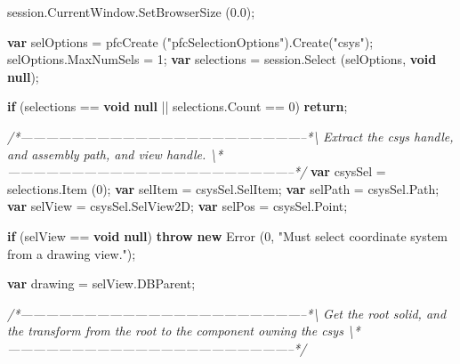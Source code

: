 \documentclass[]{article}
\newenvironment{Shaded}{}{}
\newcommand{\KeywordTok}[1]{\textcolor[rgb]{0.00,0.44,0.13}{\textbf{{#1}}}}
\newcommand{\DecValTok}[1]{\textcolor[rgb]{0.25,0.63,0.44}{{#1}}}
\newcommand{\FloatTok}[1]{\textcolor[rgb]{0.25,0.63,0.44}{{#1}}}
\newcommand{\StringTok}[1]{\textcolor[rgb]{0.25,0.44,0.63}{{#1}}}
\newcommand{\CommentTok}[1]{\textcolor[rgb]{0.38,0.63,0.69}{\textit{{#1}}}}
\newcommand{\OtherTok}[1]{\textcolor[rgb]{0.00,0.44,0.13}{{#1}}}
\newcommand{\FunctionTok}[1]{\textcolor[rgb]{0.02,0.16,0.49}{{#1}}}
\newcommand{\NormalTok}[1]{{#1}}
\begin{document}
\begin{Shaded}
\begin{Highlighting}[]
  \OtherTok{session}\NormalTok{.}\OtherTok{CurrentWindow}\NormalTok{.}\FunctionTok{SetBrowserSize} \NormalTok{(}\FloatTok{0.0}\NormalTok{);}
  
  \KeywordTok{var} \NormalTok{selOptions = }\FunctionTok{pfcCreate} \NormalTok{(}\StringTok{"pfcSelectionOptions"}\NormalTok{).}\FunctionTok{Create}\NormalTok{(}\StringTok{"csys"}\NormalTok{);}
  \OtherTok{selOptions}\NormalTok{.}\FunctionTok{MaxNumSels} \NormalTok{= }\DecValTok{1}\NormalTok{;}
  \KeywordTok{var} \NormalTok{selections = }\OtherTok{session}\NormalTok{.}\FunctionTok{Select} \NormalTok{(selOptions, }\KeywordTok{void} \KeywordTok{null}\NormalTok{);}
  
  \KeywordTok{if} \NormalTok{(selections == }\KeywordTok{void} \KeywordTok{null} \NormalTok{|| }\OtherTok{selections}\NormalTok{.}\FunctionTok{Count} \NormalTok{== }\DecValTok{0}\NormalTok{)}
    \KeywordTok{return}\NormalTok{;}
        
\CommentTok{/*--------------------------------------------------------------------*\textbackslash{}    }
\CommentTok{  Extract the csys handle, and assembly path, and view handle.}
\CommentTok{\textbackslash{}*--------------------------------------------------------------------*/}
  \KeywordTok{var} \NormalTok{csysSel = }\OtherTok{selections}\NormalTok{.}\FunctionTok{Item} \NormalTok{(}\DecValTok{0}\NormalTok{);}
  \KeywordTok{var} \NormalTok{selItem = }\OtherTok{csysSel}\NormalTok{.}\FunctionTok{SelItem}\NormalTok{;}
  \KeywordTok{var} \NormalTok{selPath = }\OtherTok{csysSel}\NormalTok{.}\FunctionTok{Path}\NormalTok{;  }
  \KeywordTok{var} \NormalTok{selView = }\OtherTok{csysSel}\NormalTok{.}\FunctionTok{SelView2D}\NormalTok{;}
  \KeywordTok{var} \NormalTok{selPos = }\OtherTok{csysSel}\NormalTok{.}\FunctionTok{Point}\NormalTok{;}
  
  \KeywordTok{if} \NormalTok{(selView == }\KeywordTok{void} \KeywordTok{null}\NormalTok{)}
    \KeywordTok{throw} \KeywordTok{new} \FunctionTok{Error} \NormalTok{(}\DecValTok{0}\NormalTok{, }\StringTok{"Must select coordinate system from a drawing view."}\NormalTok{);}
  
  \KeywordTok{var} \NormalTok{drawing = }\OtherTok{selView}\NormalTok{.}\FunctionTok{DBParent}\NormalTok{;}
    
\CommentTok{/*--------------------------------------------------------------------*\textbackslash{}    }
\CommentTok{  Get the root solid, and the transform from the root to the}
\CommentTok{  component owning the csys}
\CommentTok{\textbackslash{}*--------------------------------------------------------------------*/}


\end{Highlighting}
\end{Shaded}
\end{document}
